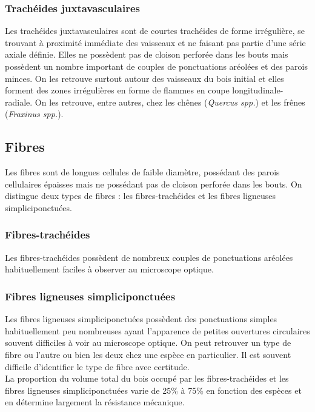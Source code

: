 \subsubsection{Trachéides juxtavasculaires}

Les trachéides juxtavasculaires sont de courtes trachéides de forme irrégulière, se trouvant à proximité immédiate des vaisseaux et ne faisant pas partie d'une série axiale définie. Elles ne possèdent pas de cloison perforée dans les bouts mais possèdent un nombre important de couples de ponctuations aréolées et des parois minces. On les retrouve surtout autour des vaisseaux du bois initial et elles forment des zones irrégulières en forme de flammes en coupe longitudinale-radiale. On les retrouve, entre autres, chez les chênes (\textit{Quercus spp.}) et les frênes (\textit{Fraxinus spp.}).

\subsection{Fibres}

Les fibres sont de longues cellules de faible diamètre, possédant des parois cellulaires épaisses mais ne possédant pas de cloison perforée dans les bouts. On distingue deux types de fibres : les fibres-trachéides et les fibres ligneuses simpliciponctuées.

\subsubsection{Fibres-trachéides}

Les fibres-trachéides possèdent de nombreux couples de ponctuations aréolées habituellement faciles à observer au microscope optique.

\subsubsection{Fibres ligneuses simpliciponctuées}

Les fibres ligneuses simpliciponctuées  possèdent des ponctuations simples habituellement peu nombreuses ayant l'apparence de petites ouvertures circulaires souvent difficiles à voir au microscope optique. On peut retrouver un type de fibre ou l'autre ou bien les deux chez une espèce en particulier. Il est souvent difficile d'identifier le type de fibre avec certitude. \\

La proportion du volume total du bois occupé par les fibres-trachéides et les fibres ligneuses simpliciponctuées varie de 25\% à 75\% en fonction des espèces et en détermine largement la résistance mécanique.

